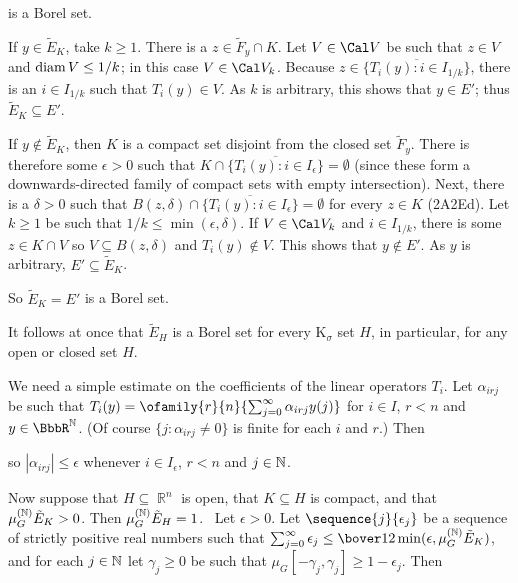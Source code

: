 {\noindent is a Borel set.

If $y\in\tilde E_K$, take $k\ge 1$.   There is a
$z\in\tilde F_y\cap K$.   Let $V\in\Cal V$ be such that $z\in V$ and
$\mathop{\text{diam}} V\le 1/k$;  in this case $V\in\Cal V_k$.   Because
$z\in\overline{\{T_i(y):i\in I_{1/k}\}}$, there is an
$i\in I_{1/k}$ such that $T_i(y)\in V$.   As $k$ is arbitrary, this
shows that $y\in E'$;  thus $\tilde E_K\subseteq E'$.

If $y\notin\tilde E_K$, then $K$ is a compact set disjoint from the
closed set $\tilde F_y$.   There is therefore some $\epsilon>0$ such
that $K\cap\overline{\{T_i(y):i\in I_{\epsilon}\}}=\emptyset$ (since
these form a downwards-directed family of compact sets with empty
intersection).   Next, there is a $\delta>0$ such that
$B(z,\delta)\cap\overline{\{T_i(y):i\in I_{\epsilon}\}}=\emptyset$ for
every $z\in K$ (2A2Ed).   Let $k\ge 1$ be such that
$1/k\le\min(\epsilon,\delta)$.   If $V\in\Cal V_k$ and
$i\in I_{1/k}$, there is some $z\in K\cap V$ so $V\subseteq B(z,\delta)$
and $T_i(y)\notin V$.  This shows that $y\notin E'$.   As $y$ is
arbitrary, $E'\subseteq\tilde E_K$.

So $\tilde E_K=E'$ is a Borel set.\ \Qed

It follows at once that $\tilde E_H$ is a Borel set for every
K$_{\sigma}$ set $H$, in particular, for any open or closed set $H$.

\medskip

 We need a simple estimate on the coefficients of the
linear operators $T_i$.   Let $\alpha_{irj}$ be such that
$T_i(y)=\ofamily{r}{n}{\sum_{j=0}^{\infty}\alpha_{irj}y(j)}$ for
$i\in I$, $r<n$ and $y\in\BbbR^{\Bbb N}$.   (Of course
$\{j:\alpha_{irj}\ne 0\}$ is finite for each $i$ and $r$.)   Then


\noindent so $|\alpha_{irj}|\le\epsilon$ whenever $i\in I_{\epsilon}$,
$r<n$ and $j\in\Bbb N$.

\medskip

 Now suppose that $H\subseteq\BbbR^n$ is open, that
$K\subseteq H$ is compact, and that $\mu_G^{(\Bbb N)}\tilde E_K>0$.
Then $\mu_G^{(\Bbb N)}\tilde E_H=1$.   \Prf\ Let $\epsilon>0$.   Let
$\sequence{j}{\epsilon_j}$ be a sequence of strictly positive real
numbers such that $\sum_{j=0}^{\infty}\epsilon_j
\le\bover12\min(\epsilon,\mu_G^{(\Bbb N)}\tilde E_K)$, and for each
$j\in\Bbb N$ let $\gamma_j\ge 0$ be such that
$\mu_G[-\gamma_j,\gamma_j]\ge 1-\epsilon_j$.   Then

}
